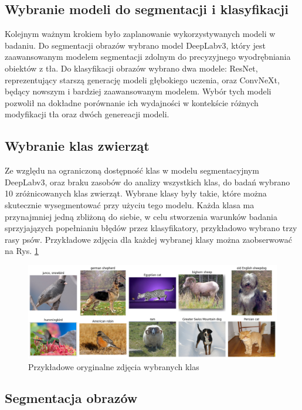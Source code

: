 \subsection*{Wybranie modeli do segmentacji i klasyfikacji}

Kolejnym ważnym krokiem było zaplanowanie wykorzystywanych modeli w badaniu. Do segmentacji obrazów wybrano model DeepLabv3, który jest zaawansowanym modelem segmentacji zdolnym do precyzyjnego wyodrębniania obiektów z tła. 
Do klasyfikacji obrazów wybrano dwa modele: ResNet, reprezentujący starszą generację modeli głębokiego uczenia, oraz ConvNeXt, będący nowszym i bardziej zaawansowanym modelem. Wybór tych modeli pozwolił na dokładne porównanie ich wydajności 
w kontekście różnych modyfikacji tła oraz dwóch genereacji modeli.

\subsection*{Wybranie klas zwierząt}

Ze względu na ograniczoną dostępność klas w modelu segmentacyjnym DeepLabv3, oraz braku zasobów do analizy wszystkich klas, do badań wybrano 10 zróżnicowanych klas zwierząt. Wybrane klasy były takie, które można skutecznie wysegmentować przy 
użyciu tego modelu. Każda klasa ma przynajmniej jedną zbliżoną do siebie, w celu stworzenia warunków badania sprzyjajązych popełnianiu błędów przez klasyfikatory, przykładowo wybrano trzy rasy psów. Przykładowe zdjęcia dla każdej wybranej 
klasy można zaobserwować na Rys. \ref{rys:classes}

\begin{figure}
	\centering\includegraphics[width=.9\textwidth]{img/classes}
	\caption{Przykładowe oryginalne zdjęcia wybranych klas}  \label{rys:classes}
\end{figure}

\subsection*{Segmentacja obrazów}


